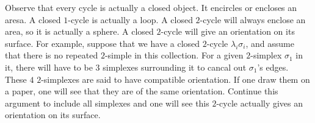 \begin{key}
    \label{key:2cycle-orientation}
    Observe that every cycle is actually a closed object. It encircles
    or encloses an aresa. A closed $1$-cycle is actually a loop. A
    closed $2$-cycle will always enclose an area, so it is actually a
    sphere. A closed $2$-cycle will give an orientation on its
    surface. For example, suppose that we have a closed $2$-cycle
    $\lambda_i\sigma_i$, and assume that there is no repeated
    $2$-simple in this collection. For a given $2$-simplex $\sigma_1$
    in it, there will have to be $3$ simplexes surrounding it to
    cancal out $\sigma_1$'s edges. These $4$ $2$-simplexes are said to
    have compatible orientation. If one draw them on a paper, one will
    see that they are of the same orientation. Continue this argument
    to include all simplexes and one will see this $2$-cycle actually
    gives an orientation on its surface.
\end{key}
